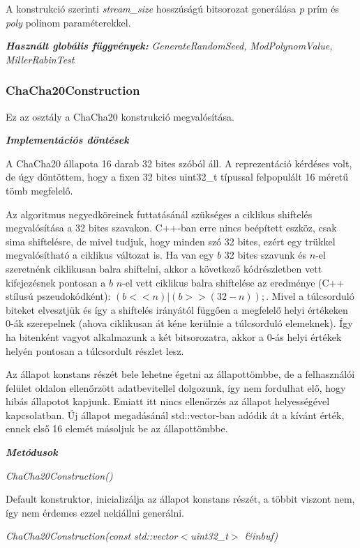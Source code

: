 \documentclass[12pt]{article}
\begin{document}
A konstrukció szerinti \textit{stream\_size} hosszúságú bitsorozat generálása \textit{p} prím és \textit{poly} polinom paraméterekkel.

\textbf{\textit{Használt globális függvények: }}\textit{GenerateRandomSeed, ModPolynomValue, MillerRabinTest}

\subsubsection*{ChaCha20Construction}
Ez az osztály a ChaCha20 konstrukció megvalósítása.

\textbf{\textit{Implementációs döntések}}

A ChaCha20 állapota 16 darab 32 bites szóból áll. A reprezentáció kérdéses volt, de úgy döntöttem, hogy a fixen 32 bites uint32\_t típussal felpopulált 16 méretű tömb megfelelő.

Az algoritmus negyedköreinek futtatásánál szükséges a ciklikus shiftelés megvalósítása a 32 bites szavakon. C++-ban erre nincs beépített eszköz, csak sima shiftelésre, de mivel tudjuk, hogy minden szó 32 bites, ezért egy trükkel megvalósítható a ciklikus változat is. Ha van egy $b$ 32 bites szavunk és $n$-el szeretnénk ciklikusan balra shiftelni, akkor a következő kódrészletben vett kifejezésnek pontosan a $b$ $n$-el vett ciklikus balra shiftelése az eredménye (C++ stílusú pszeudokódként): $(b << n) | (b >> (32-n));$. Mivel a túlcsorduló biteket elvesztjük és így a shiftelés irányától függően a megfelelő helyi értékeken 0-ák szerepelnek (ahova ciklikusan át kéne kerülnie a túlcsorduló elemeknek). Így ha bitenként vagyot alkalmazunk a két bitsorozatra, akkor a 0-ás helyi értékek helyén pontosan a túlcsordult részlet lesz.

Az állapot konstans részét bele lehetne égetni az állapottömbbe, de a felhasználói felület oldalon ellenőrzött adatbevitellel dolgozunk, így nem fordulhat elő, hogy hibás állapotot kapjunk. Emiatt itt nincs ellenőrzés az állapot helyességével kapcsolatban. Új állapot megadásánál std::vector-ban adódik át a kívánt érték, ennek első 16 elemét másoljuk be az állapottömbbe.

\textbf{\textit{Metódusok}}

\textit{ChaCha20Construction()}

Default konstruktor, inicializálja az állapot konstans részét, a többit viszont nem, így nem érdemes ezzel nekiállni generálni.

\textit{ChaCha20Construction(const std::vector$<$uint32\_t$>$ \&inbuf)}
\end{document}
